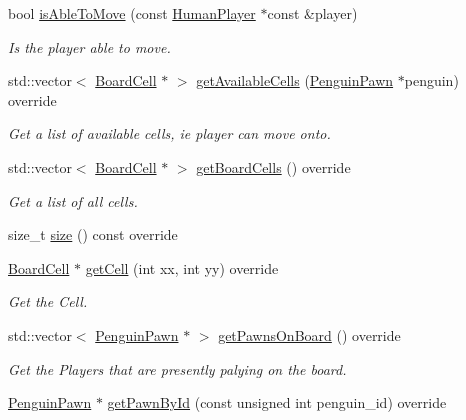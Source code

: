 \begin{DoxyCompactItemize}
bool \hyperlink{classgame_1_1penguin_1_1_board_ae85ef3019829098c5ad5afb1c3ebceb5}{is\+Able\+To\+Move} (const \hyperlink{classgame_1_1penguin_1_1_human_player}{Human\+Player} $\ast$const \&player)
\begin{DoxyCompactList}\small\item\em Is the player able to move. \end{DoxyCompactList}\item 
std\+::vector$<$ \hyperlink{classgame_1_1penguin_1_1_board_cell}{Board\+Cell} $\ast$ $>$ \hyperlink{classgame_1_1penguin_1_1_board_a26bc6f1c2da1197d9b68f9b4c4e3126b}{get\+Available\+Cells} (\hyperlink{classgame_1_1penguin_1_1_penguin_pawn}{Penguin\+Pawn} $\ast$penguin) override
\begin{DoxyCompactList}\small\item\em Get a list of available cells, ie player can move onto. \end{DoxyCompactList}\item 
std\+::vector$<$ \hyperlink{classgame_1_1penguin_1_1_board_cell}{Board\+Cell} $\ast$ $>$ \hyperlink{classgame_1_1penguin_1_1_board_afae3ac9e82200303d28dd4cf7bfa12ec}{get\+Board\+Cells} () override
\begin{DoxyCompactList}\small\item\em Get a list of all cells. \end{DoxyCompactList}\item 
size\+\_\+t \hyperlink{classgame_1_1penguin_1_1_board_a7636e3bdb2da72d2a6395b1a2d846394}{size} () const override
\item 
\hyperlink{classgame_1_1penguin_1_1_board_cell}{Board\+Cell} $\ast$ \hyperlink{classgame_1_1penguin_1_1_board_ac9fbe04a302208fcb5f66e717182b6d4}{get\+Cell} (int xx, int yy) override
\begin{DoxyCompactList}\small\item\em Get the Cell. \end{DoxyCompactList}\item 
std\+::vector$<$ \hyperlink{classgame_1_1penguin_1_1_penguin_pawn}{Penguin\+Pawn} $\ast$ $>$ \hyperlink{classgame_1_1penguin_1_1_board_a13a38d7c935dd363d7ec9394488539ee}{get\+Pawns\+On\+Board} () override
\begin{DoxyCompactList}\small\item\em Get the Players that are presently palying on the board. \end{DoxyCompactList}\item 
\hyperlink{classgame_1_1penguin_1_1_penguin_pawn}{Penguin\+Pawn} $\ast$ \hyperlink{classgame_1_1penguin_1_1_board_acae84c13dacef3bd988d1ea9a41d055f}{get\+Pawn\+By\+Id} (const unsigned int penguin\+\_\+id) override

\end{DoxyCompactItemize}
